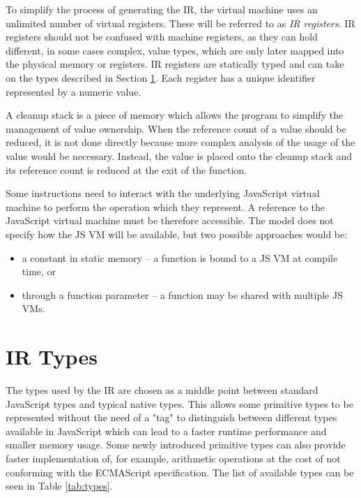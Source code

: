 To simplify the process of generating the IR, the virtual machine uses an unlimited number of virtual registers. These will be referred to as \textit{IR registers}. IR registers should not be confused with machine registers, as they can hold different, in some cases complex, value types, which are only later mapped into the physical memory or registers. IR registers are statically typed and can take on the types described in Section \ref{ir:types}. Each register has a unique identifier represented by a numeric value.

A cleanup stack is a piece of memory which allows the program to simplify the management of value ownership. When the reference count of a value should be reduced, it is not done directly because more complex analysis of the usage of the value would be necessary. Instead, the value is placed onto the cleanup stack and its reference count is reduced at the exit of the function.

Some instructions need to interact with the underlying JavaScript virtual machine to perform the operation which they represent. A reference to the JavaScript virtual machine must be therefore accessible. The model does not specify how the JS VM will be available, but two possible approaches would be:
\begin{itemize}
    \item a constant in static memory -- a function is bound to a JS VM at compile time, or
    \item through a function parameter -- a function may be shared with multiple JS VMs.
\end{itemize}


\section{IR Types}\label{ir:types}

The types used by the IR are chosen as a middle point between standard JavaScript types and typical native types. This allows some primitive types to be represented without the need of a "tag" to distinguish between different types available in JavaScript which can lead to a faster runtime performance and smaller memory usage. Some newly introduced primitive types can also provide faster implementation of, for example, arithmetic operations at the cost of not conforming with the ECMAScript specification. The list of available types can be seen in Table \ref{tab:types}.

